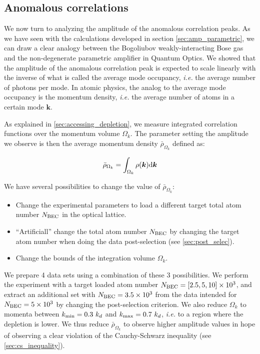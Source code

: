 \subsection{Anomalous correlations}

We now turn to analyzing the amplitude of the anomalous correlation peaks. As we have seen with the calculations developed in section \ref{sec:amp_parametric}, we can draw a clear analogy between the Bogoliubov weakly-interacting Bose gas and the non-degenerate parametric amplifier in Quantum Optics. We showed that the amplitude of the anomalous correlation peak is expected to scale linearly with the inverse of what is called the average mode occupancy, {\it i.e.} the average number of photons per mode. In atomic physics, the analog to the average mode occupancy is the momentum density, {\it i.e.} the average number of atoms in a certain mode $\bm{k}$.

As explained in \ref{sec:accessing_depletion}, we measure integrated correlation functions over the momentum volume $\Omega_k$. The parameter setting the amplitude we observe is then the average momentum density $\bar{\rho}_{\Omega_k}$ defined as:

\begin{equation}
    \bar{\rho}_{\Omega_k}=\int_{\Omega_{k}} \rho({\bm k}) {\rm d}{\bm k}
\end{equation}

We have several possibilities to change the value of $\bar{\rho}_{\Omega_k}$:

\begin{itemize}
    \item Change the experimental parameters to load a different target total atom number $N_{\rm{BEC}}$ in the optical lattice.
    \item ``Artificiall'' change the total atom number $N_{\rm{BEC}}$ by changing the target atom number when doing the data post-selection (see \ref{sec:post_selec}).
    \item Change the bounds of the integration volume $\Omega_k$.
\end{itemize}

We prepare 4 data sets using a combination of these 3 possibilities. We perform the experiment with a target loaded atom number $N_{\rm{BEC}}=[2.5,5,10] \times 10^3$, and extract an additional set with $N_{\rm{BEC}}=3.5 \times 10^3$ from the data intended for $N_{\rm{BEC}} = 5 \times 10^3$ by changing the post-selection criterion. We also reduce $\Omega_k$ to momenta between $k_{\rm{min}} = 0.3 \ k_d$ and $k_{\rm{max}} = 0.7 \ k_d$, {\it i.e.} to a region where the depletion is lower. We thus reduce $\bar{\rho}_{\Omega_k}$ to observe higher amplitude values in hope of observing a clear violation of the Cauchy-Schwarz inequality (see \ref{sec:cs_inequality}).


